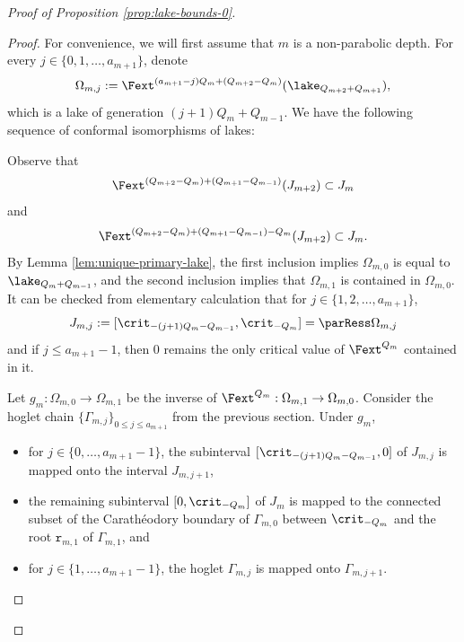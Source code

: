 \documentclass{amsart}
\begin{document}
\begin{proof}[Proof of Proposition \ref{prop:lake-bounds-0}]
    \begin{proof}
        For convenience, we will first assume that $m$ is a non-parabolic depth. 
        For every $j \in \{0,1,\ldots, a_{m+1}\}$, denote
    \[
        \Omega_{m,j} := \Fext^{(a_{m+1}-j)Q_m + (Q_{m+2}-Q_m)}(\lake_{Q_{m+2}+Q_{m+1}}),
    \]
    which is a lake of generation $(j+1)Q_m + Q_{m-1}$.
    We have the following sequence of conformal isomorphisms of lakes:
    \begin{center}
    \end{center}
    
    Observe that 
    \[
        \Fext^{(Q_{m+2}-Q_m)+(Q_{m+1}-Q_{m-1})}(J_{m+2}) \subset J_m
    \]
    and
    \[
        \Fext^{(Q_{m+2}-Q_m)+(Q_{m+1}-Q_{m-1})-Q_m}(J_{m+2}) \subset J_m.
    \]
    By Lemma \ref{lem:unique-primary-lake}, the first inclusion implies $\Omega_{m,0}$ is equal to $\lake_{Q_m+Q_{m-1}}$, and the second inclusion implies that $\Omega_{m,1}$ is contained in $\Omega_{m,0}$.
    It can be checked from elementary calculation that for $j \in \{ 1, 2,\ldots, a_{m+1}\}$,
    \[
        J_{m,j}:= [\crit_{-(j+1)Q_m-Q_{m-1}}, \crit_{-Q_m}] = \parRess \Omega_{m,j}
    \]
    and if $j \leq a_{m+1}-1$, then $0$ remains the only critical value of $\Fext^{Q_m}$ contained in it.

    Let $g_m: \Omega_{m,0} \to \Omega_{m,1}$ be the inverse of $\Fext^{Q_m} : \Omega_{m,1} \to \Omega_{m,0}$.
    Consider the hoglet chain $\{\Gamma_{m,j} \}_{0 \leq j \leq a_{m+1}}$ from the previous section.
    Under $g_m$,
    \begin{itemize}
        \item for $j \in \{ 0, \ldots, a_{m+1}-1\}$, the subinterval $[\crit_{-(j+1)Q_m-Q_{m-1}}, 0]$ of $J_{m,j}$ is mapped onto the interval $J_{m,j+1}$,
        \item the remaining subinterval $[0, \crit_{-Q_m}]$ of $J_m$ is mapped to the connected subset of the Carath\'eodory boundary of $\Gamma_{m,0}$ between $\crit_{-Q_m}$ and the root $\mathtt{r}_{m,1}$ of $\Gamma_{m,1}$, and 
        \item for $j \in \{ 1, \ldots, a_{m+1}-1\}$, the hoglet $\Gamma_{m,j}$ is mapped onto $\Gamma_{m,j+1}$.
    \end{itemize}


\end{proof}
\end{proof}
\end{document}
